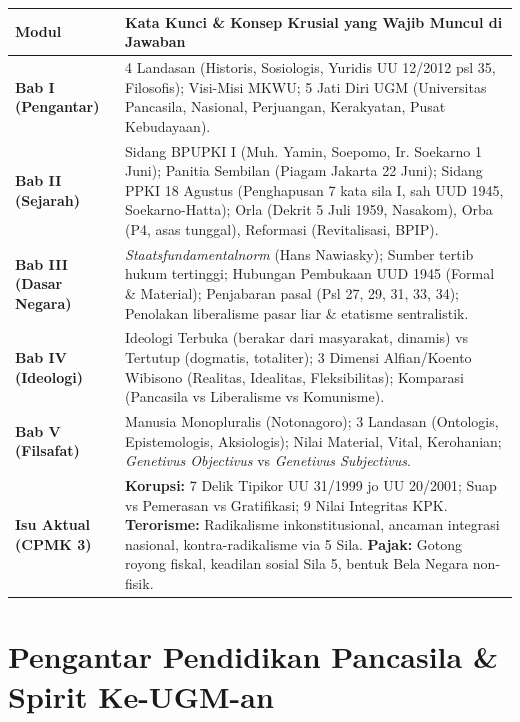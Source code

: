 \documentclass[10pt,a4paper]{article}
\begin{document}
\begin{examtipbox}
\begin{tabularx}{\linewidth}{lX}
  \textbf{Modul} & \textbf{Kata Kunci \& Konsep Krusial yang Wajib Muncul di Jawaban} \\
  \midrule
  \textbf{Bab I (Pengantar)} & 4 Landasan (Historis, Sosiologis, Yuridis UU 12/2012 psl 35, Filosofis); Visi-Misi MKWU; 5 Jati Diri UGM (Universitas Pancasila, Nasional, Perjuangan, Kerakyatan, Pusat Kebudayaan). \\
  \textbf{Bab II (Sejarah)} & Sidang BPUPKI I (Muh. Yamin, Soepomo, Ir. Soekarno 1 Juni); Panitia Sembilan (Piagam Jakarta 22 Juni); Sidang PPKI 18 Agustus (Penghapusan 7 kata sila I, sah UUD 1945, Soekarno-Hatta); Orla (Dekrit 5 Juli 1959, Nasakom), Orba (P4, asas tunggal), Reformasi (Revitalisasi, BPIP). \\
  \textbf{Bab III (Dasar Negara)} & \textit{Staatsfundamentalnorm} (Hans Nawiasky); Sumber tertib hukum tertinggi; Hubungan Pembukaan UUD 1945 (Formal \& Material); Penjabaran pasal (Psl 27, 29, 31, 33, 34); Penolakan liberalisme pasar liar \& etatisme sentralistik. \\
  \textbf{Bab IV (Ideologi)} & Ideologi Terbuka (berakar dari masyarakat, dinamis) vs Tertutup (dogmatis, totaliter); 3 Dimensi Alfian/Koento Wibisono (Realitas, Idealitas, Fleksibilitas); Komparasi (Pancasila vs Liberalisme vs Komunisme). \\
  \textbf{Bab V (Filsafat)} & Manusia Monopluralis (Notonagoro); 3 Landasan (Ontologis, Epistemologis, Aksiologis); Nilai Material, Vital, Kerohanian; \textit{Genetivus Objectivus} vs \textit{Genetivus Subjectivus}. \\
  \textbf{Isu Aktual (CPMK 3)} & \textbf{Korupsi:} 7 Delik Tipikor UU 31/1999 jo UU 20/2001; Suap vs Pemerasan vs Gratifikasi; 9 Nilai Integritas KPK. \textbf{Terorisme:} Radikalisme inkonstitusional, ancaman integrasi nasional, kontra-radikalisme via 5 Sila. \textbf{Pajak:} Gotong royong fiskal, keadilan sosial Sila 5, bentuk Bela Negara non-fisik. \\
  \bottomrule
\end{tabularx}
\end{examtipbox}

\vspace{1mm}

\section{Pengantar Pendidikan Pancasila \& Spirit Ke-UGM-an}
\end{document}
